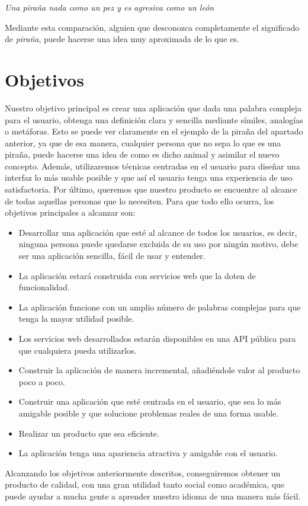 \textit{Una piraña nada como un pez y es agresiva como un león} \newline

Mediante esta comparación, alguien que desconozca completamente el significado de \textit{piraña}, puede hacerse una idea muy aproximada de lo que es.
\section{Objetivos}
\label{cap:sec:objetivos}
Nuestro objetivo principal es crear una aplicación que dada una palabra compleja para el usuario, obtenga una definición clara y sencilla mediante símiles, analogías o metáforas. 
Esto se puede ver claramente en el ejemplo de la piraña del apartado anterior, ya que de esa manera, cualquier persona que no sepa lo que es una piraña, puede hacerse una idea de como es dicho animal y asimilar el nuevo concepto. Además, utilizaremos técnicas centradas en el usuario para diseñar una interfaz lo más usable posible y que así el usuario tenga una experiencia de uso satisfactoria. Por último, queremos que nuestro producto se encuentre al alcance de todas aquellas personas que lo necesiten.
 Para que todo ello ocurra, los objetivos principales a alcanzar son:
\begin{itemize}
	\item Desarrollar una aplicación que esté al alcance de todos los usuarios, es decir, ninguna persona puede quedarse excluida de su uso por ningún motivo, debe ser una aplicación sencilla, fácil de usar y entender.

	\item La aplicación estará construida con servicios web que la doten de funcionalidad.
	
	\item La aplicación funcione con un amplio número de palabras complejas para que tenga la mayor utilidad posible.
	
	\item Los servicios web desarrollados estarán disponibles en una API pública para que cualquiera pueda utilizarlos.
	
	\item Construir la aplicación de manera incremental, añadiéndole valor al producto poco a poco.
	
	\item Construir una aplicación que esté centrada en el usuario, que sea lo más amigable posible y que solucione problemas reales de una forma usable.
	
	\item Realizar un producto que sea eficiente.
	
	\item La aplicación tenga una apariencia atractiva y amigable con el usuario.
\end{itemize}
Alcanzando los objetivos anteriormente descritos, conseguiremos obtener un producto de calidad, con una gran utilidad tanto social como académica, que puede ayudar a mucha gente a aprender nuestro idioma de una manera más fácil.

